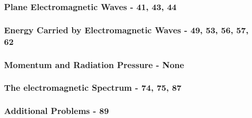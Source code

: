 \documentclass[12pt, letterpaper, twoside]{article}
\begin{document}
  \subsubsection{Plane Electromagnetic Waves - 41, 43, 44}
  
  \subsubsection{Energy Carried by Electromagnetic Waves - 49, 53, 56, 57, 62}
  
  \subsubsection{Momentum and Radiation Pressure - None}

  \subsubsection{The electromagnetic Spectrum - 74, 75, 87}
  
  \subsubsection*{Additional Problems - 89}
\end{document}
